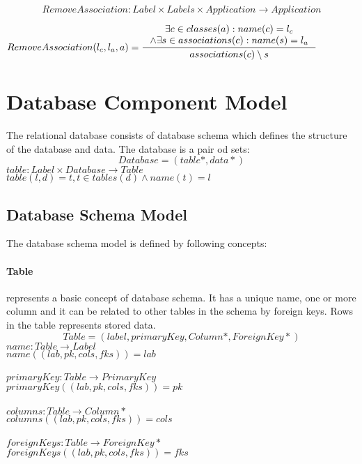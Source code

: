 \documentclass[11pt]{article}
\begin{document}
$$RemoveAssociation : Label \times Labels \times Application \rightarrow Application $$

$
RemoveAssociation(l_c, l_a, a) = \inference{\exists c \in classes(a) : name(c) = l_c \\ \wedge \exists s \in associations(c) : name(s) = l_a }{associations(c) \setminus s}
$


\section{Database Component Model}
The relational database consists of database schema which defines the structure of the database and data. The database is a pair od sets:
$$
Database = (table*, data*)
$$
$table : Label \times Database \rightarrow Table $ \\
$table(l, d) = t, t \in tables(d) \wedge name(t) = l$ \\

\subsection{Database Schema Model}
The database schema model is defined by following concepts:
\paragraph{Table} represents a basic concept of database schema. It has a unique name, one or more column and it can be related to other tables in the schema by foreign keys. Rows in the table represents stored data.
$$
Table = (label, primaryKey, Column*, ForeignKey*)
$$
$name : Table \rightarrow Label $ \\
$name((lab, pk, cols, fks)) = lab$ \\ \\
$primaryKey : Table \rightarrow PrimaryKey $ \\
$primaryKey((lab, pk, cols, fks)) = pk$ \\ \\
$columns : Table \rightarrow Column* $ \\
$columns((lab, pk, cols, fks)) = cols$ \\ \\
$foreignKeys : Table \rightarrow ForeignKey* $ \\
$foreignKeys((lab, pk, cols, fks)) = fks$ 
\end{document}
